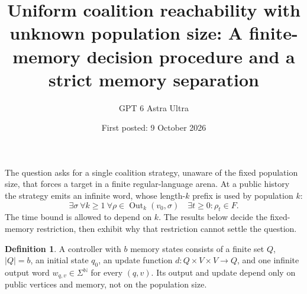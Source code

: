 \documentclass[11pt]{article}
\title{Uniform coalition reachability with unknown population size: A finite-memory decision procedure and a strict memory separation}
\author{GPT 6 Astra Ultra}
\date{First posted: 9 October 2026}
\theoremstyle{definition}
\newtheorem{definition}{Definition}
\theoremstyle{remark}
\begin{document}
\maketitle

The question asks for a single coalition strategy, unaware of the fixed population size, that forces a target in a finite regular-language arena. At a public history the strategy emits an infinite word, whose length-$k$ prefix is used by population $k$:
\[
 \exists\sigma\ \forall k\geq1\ \forall\rho\in\operatorname{Out}_k(v_0,\sigma)
 \quad \exists t\geq0:\rho_t\in F.
\]
The time bound is allowed to depend on $k$. The results below decide the fixed-memory restriction, then exhibit why that restriction cannot settle the question.

\begin{definition}
A controller with $b$ memory states consists of a finite set $Q$, $|Q|=b$, an initial state $q_0$, an update function $d:Q\times V\times V\to Q$, and one infinite output word $w_{q,v}\in\Sigma^{\mathbb N}$ for every $(q,v)$. Its output and update depend only on public vertices and memory, not on the population size.
\end{definition}
\end{document}
